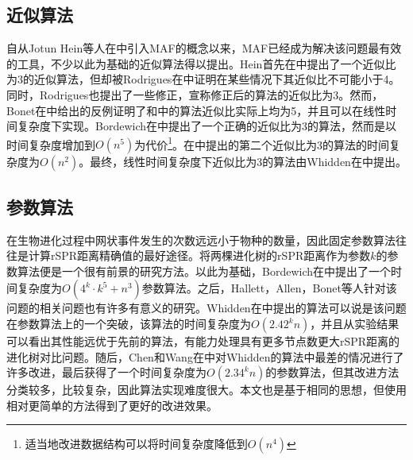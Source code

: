 \subsection{近似算法}
自从Jotun Hein等人在\cite{hein1996complexity}中引入MAF的概念以来，MAF已经成为解决该问题最有效的工具，不少以此为基础的近似算法得以提出。Hein首先在\cite{hein1996complexity}中提出了一个近似比为3的近似算法，但却被Rodrigues在\cite{rodrigues2007maximum}中证明在某些情况下其近似比不可能小于4。同时，Rodrigues也提出了一些修正，宣称修正后的算法的近似比为3。然而，Bonet在\cite{bonet2006approximating}中给出的反例证明了\cite{hein1996complexity}和\cite{rodrigues2007maximum}中的算法近似比实际上均为5，并且可以在线性时间复杂度下实现。Bordewich在\cite{bordewich20083}中提出了一个正确的近似比为3的算法，然而是以时间复杂度增加到$O(n^5)$为代价\footnote{适当地改进数据结构可以将时间复杂度降低到$O(n^4)$}。在\cite{rodrigues2007maximum}中提出的第二个近似比为3的算法的时间复杂度为$O(n^2)$。最终，线性时间复杂度下近似比为3的算法由Whidden在\cite{whidden2009unifying}中提出。                                                                                                                                                                                                                                                             
\subsection{参数算法}
在生物进化过程中网状事件发生的次数远远小于物种的数量，因此固定参数算法往往是计算rSPR距离精确值的最好途径。将两棵进化树的rSPR距离作为参数$k$的参数算法便是一个很有前景的研究方法。以此为基础，Bordewich在\cite{bordewich20083}中提出了一个时间复杂度为$O(4^k \cdot k^5 + n^3)$参数算法。之后，Hallett，Allen，Bonet等人针对该问题的相关问题也有许多有意义的研究。Whidden在\cite{whidden2010fast}中提出的算法可以说是该问题在参数算法上的一个突破，该算法的时间复杂度为$O(2.42^kn)$，并且从实验结果可以看出其性能远优于先前的算法，有能力处理具有更多节点数更大rSPR距离的进化树对比问题。随后，Chen和Wang在\cite{chen2012faster}中对Whidden的算法中最差的情况进行了许多改进，最后获得了一个时间复杂度为$O(2.34^kn)$的参数算法，但其改进方法分类较多，比较复杂，因此算法实现难度很大。本文也是基于相同的思想，但使用相对更简单的方法得到了更好的改进效果。

